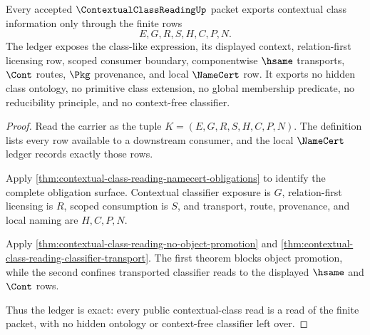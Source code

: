 \begin{theorem}
\label{thm:contextual-class-reading-ledger-exactness}
Every accepted $\ContextualClassReadingUp$ packet exports contextual class information only through the finite rows
$$
E,G,R,S,H,C,P,N.
$$
The ledger exposes the class-like expression, its displayed context, relation-first licensing row, scoped consumer boundary, componentwise $\hsame$ transports, $\Cont$ routes, $\Pkg$ provenance, and local $\NameCert$ row. It exports no hidden class ontology, no primitive class extension, no global membership predicate, no reducibility principle, and no context-free classifier.
\end{theorem}
\begin{proof}
Read the carrier as the tuple $K=(E,G,R,S,H,C,P,N)$. The definition lists every row available to a downstream consumer, and the local $\NameCert$ ledger records exactly those rows.

Apply \autoref{thm:contextual-class-reading-namecert-obligations} to identify the complete obligation surface. Contextual classifier exposure is $G$, relation-first licensing is $R$, scoped consumption is $S$, and transport, route, provenance, and local naming are $H,C,P,N$.

Apply \autoref{thm:contextual-class-reading-no-object-promotion} and \autoref{thm:contextual-class-reading-classifier-transport}. The first theorem blocks object promotion, while the second confines transported classifier reads to the displayed $\hsame$ and $\Cont$ rows.

Thus the ledger is exact: every public contextual-class read is a read of the finite packet, with no hidden ontology or context-free classifier left over.
\end{proof}

